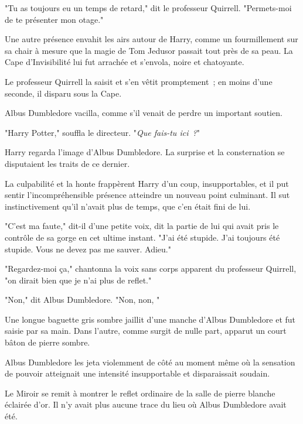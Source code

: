 "Tu as toujours eu un temps de retard," dit le professeur Quirrell. "Permets-moi de te présenter mon otage."

Une autre présence envahit les airs autour de Harry, comme un fourmillement sur sa chair à mesure que la magie de Tom Jedusor passait tout près de sa peau. La Cape d'Invisibilité lui fut arrachée et s'envola, noire et chatoyante.

Le professeur Quirrell la saisit et s'en vêtit promptement~; en moins d'une seconde, il disparu sous la Cape.

Albus Dumbledore vacilla, comme s'il venait de perdre un important soutien.

"Harry Potter," souffla le directeur. "\emph{Que fais-tu ici~?}"

Harry regarda l'image d'Albus Dumbledore. La surprise et la consternation se disputaient les traits de ce dernier.

La culpabilité et la honte frappèrent Harry d'un coup, insupportables, et il put sentir l'incompréhensible présence atteindre un nouveau point culminant. Il sut instinctivement qu'il n'avait plus de temps, que c'en était fini de lui.

"C'est ma faute," dit-il d'une petite voix, dit la partie de lui qui avait pris le contrôle de sa gorge en cet ultime instant. "J'ai été stupide. J'ai toujours été stupide. Vous ne devez pas me sauver. Adieu."

"Regardez-moi ça," chantonna la voix sans corps apparent du professeur Quirrell, "on dirait bien que je n'ai plus de reflet."

"Non," dit Albus Dumbledore. "Non, non, "

Une longue baguette gris sombre jaillit d'une manche d'Albus Dumbledore et fut saisie par sa main. Dans l'autre, comme surgit de nulle part, apparut un court bâton de pierre sombre.

Albus Dumbledore les jeta violemment de côté au moment même où la sensation de pouvoir atteignait une intensité insupportable et disparaissait soudain.

Le Miroir se remit à montrer le reflet ordinaire de la salle de pierre blanche éclairée d'or. Il n'y avait plus aucune trace du lieu où Albus Dumbledore avait été. 

